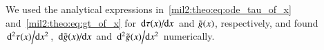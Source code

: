     We used the analytical expressions in~\cref{mil2:theo:eq:ode_tau_of_x} and~\cref{mil2:theo:eq:gt_of_x} for $\dv*{\tau(x)}{x}$ and $\tilde{g}(x)$, respectively, and found $\dv*[2]{\tau(x)}{x}$, $\dv*{\tilde{g}(x)}{x}$ and $\dv*[2]{\tilde{g}(x)}{x}$ numerically. 



